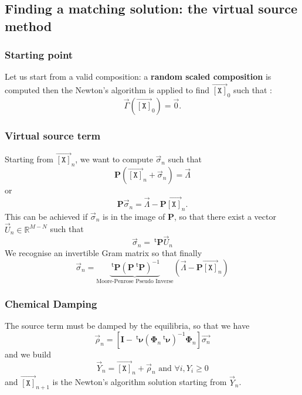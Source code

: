 \documentclass[aps,twocolumn]{revtex4}
\newcommand{\myconc}[1]{\left\lbrack #1 \right\rbrack}
\newcommand{\mychem}[1]{{\mathtt{#1}}}
\newcommand{\mymat}[1]{\boldsymbol{#1}}
\newcommand{\mytrn}[1]{{\!\!~^{\mathsf{t}}{#1}}}
\newcommand{\myvec}[1]{\overrightarrow{#1}}
\newcommand{\vecX}{\myvec{\myconc{\mychem{X}}}}
\begin{document}
\subsection{Finding a matching solution: the virtual source method}
\subsubsection{Starting point}
Let us start from a valid composition: a \textbf{random scaled composition} is computed then the Newton's algorithm is
applied to find $\vecX_0$ such that :
$$\vec{\Gamma}(\vecX_0)=\vec{0}.$$

\subsubsection{Virtual source term}
Starting from $\vecX_n$, we want to compute $\vec{\sigma}_n$  such that
$$
	\mymat{P}(\vecX_n+\vec{\sigma}_n) = \vec{\Lambda}
$$
or
$$
	\mymat{P} \vec{\sigma}_n = \vec{\Lambda} - \mymat{P} \vecX_n.
$$
This can be achieved if $\vec{\sigma}_n$ is in the image of $\mymat{P}$, so that there exist a vector $\vec{U}_n\in\mathbb{R}^{M-N}$ 
such that
$$
	\vec{\sigma}_n = \mytrn{\mymat{P}} \vec{U}_n
$$
We recognise an invertible Gram matrix so that finally
\begin{equation}
		\vec{\sigma}_n = \underbrace{\mytrn{\mymat{P}} \left(\mymat{P} \mytrn{\mymat{P}}\right)^{-1}}_{\text{Moore-Penrose Pseudo Inverse}}
		 \left( \vec{\Lambda} - \mymat{P}\vecX_n \right)
\end{equation}

\subsubsection{Chemical Damping}
The source term must be damped by the equilibria, so that we have
\begin{equation}
	\vec{\rho}_n = \left[\mymat{I} - \mytrn{\mymat{\nu}}\left(\mymat{\Phi}_n\mytrn{\mymat{\nu}}\right)^{-1}\mymat{\Phi}_n\right] \vec{\sigma_n}
\end{equation}
and we build
\begin{equation}
	\vec{Y}_n = \vecX_n + \vec{\rho}_n \text{ and } \forall i, Y_i \geq 0
\end{equation}
and $\vecX_{n+1}$ is the Newton's algorithm solution starting from $\vec{Y}_n$.
\end{document}

